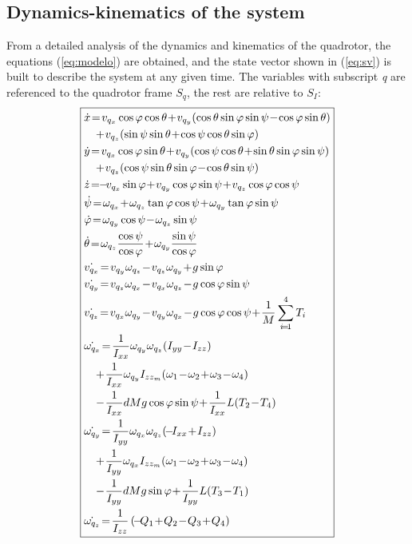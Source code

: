 \documentclass[conference]{IEEEtran}
\newcommand{\refp}[1]{(\ref{#1})}
\begin{document}
\subsection{Dynamics-kinematics of the system}
\label{sec:modelo-dyn-kin}
From a detailed analysis of the dynamics and kinematics of the quadrotor, the equations \refp{eq:modelo} are obtained, and the state vector shown in \refp{eq:sv} is built to describe the system at any given time. The variables with subscript \textit{q} are referenced to the quadrotor frame $S_q$, the rest are relative to $S_I$:
\begin{equation}
\small
\boxed{\begin{aligned}&\dot{x}\!=\!v_{q_x} \cos \varphi \cos \theta \!+\! v_{q_y} ( \cos \theta \sin \varphi \sin \psi\!-\!\cos \varphi \sin \theta )\\
&\quad \!+\! v_{q_z}(\sin \psi \sin \theta \!+\! \cos \psi \cos \theta \sin \varphi)\\
&\dot{y}\!=\!v_{q_x} \cos \varphi \sin \theta \!+\! v_{q_y} (\cos \psi \cos \theta \!+\! \sin \theta \sin \varphi \sin \psi)\\
&\quad\!+\! v_{q_z}( \cos \psi \sin \theta \sin \varphi\!-\!\cos \theta \sin \psi )\\
&\dot{z}\!=\! \!-\!v_{q_x} \sin \varphi  \!+\! v_{q_y} \cos \varphi \sin \psi  \!+\! v_{q_z}\cos \varphi \cos \psi\\
&\dot{\psi}\!=\!\omega_{q_x} \!+\! \omega_{q_z}\tan\varphi \cos\psi \!+\! \omega_{q_y}\tan\varphi \sin\psi\\
&\dot{\varphi}\!=\!\omega_{q_y}\cos \psi \!-\! \omega_{q_z}\sin\psi\\
&\dot{\theta}\!=\!\omega_{q_z} \frac{\cos\psi}{\cos\varphi}  \!+\! \omega_{q_y}\frac{\sin\psi}{\cos\varphi}\\
&\dot{v_{q_x}}\!=\!v_{q_y} \omega_{q_z} \!-\! v_{q_z} \omega_{q_y}\!+\!g\sin\varphi\\
&\dot{v_{q_y}}\!=\!v_{q_z} \omega_{q_x} \!-\! v_{q_x} \omega_{q_z}\!-\!g\cos\varphi\sin\psi\\
&\dot{v_{q_z}}\!=\!v_{q_x} \omega_{q_y} \!-\! v_{q_y} \omega_{q_x}\!-\!g\cos\varphi\cos\psi\!+\!\frac{1}{M}\sum_{i\!=\!1}^4T_i\\
&\dot{\omega_{q_x}}\!=\!\frac{1}{I_{xx}}\omega_{q_y}\omega_{q_z}(I_{yy}\!-\!I_{zz})\\
&\quad\!+\!\frac{1}{I_{xx}}\omega_{q_y}I_{zz_m}(\omega_1\!-\!\omega_2\!+\!\omega_3\!-\!\omega_4)\\
&\quad\!-\!\frac{1}{I_{xx}}dMg\cos\varphi\sin\psi\!+\!\frac{1}{I_{xx}}L(T_2\!-\!T_4)\\
&\dot{\omega_{q_y}}\!=\!\frac{1}{I_{yy}}\omega_{q_x}\omega_{q_z}(\!-\!I_{xx}\!+\!I_{zz})\\
&\quad\!+\!\frac{1}{I_{yy}}\omega_{q_x}I_{zz_m}(\omega_1\!-\!\omega_2\!+\!\omega_3\!-\!\omega_4)\\
&\quad\!-\!\frac{1}{I_{yy}}dMg\sin\varphi\!+\!\frac{1}{I_{yy}}L(T_3\!-\!T_1)\\
&\dot{\omega_{q_z}}\!=\!\frac{1}{I_{zz}}\left(\!-\!Q_1\!+\!Q_2\!-\!Q_3\!+\!Q_4\right)\\
\end{aligned}}
\label{eq:modelo}
\end{equation}
\end{document}

